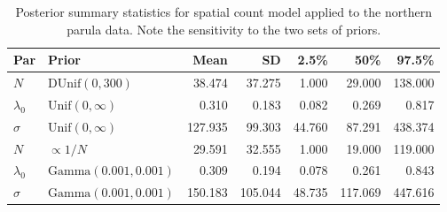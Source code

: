 \begin{table}%
  \centering
  \caption{Posterior summary statistics for spatial count
    model applied to the northern parula data. Note the sensitivity to
    the two sets of priors. }
  \begin{tabular}{llrrrrr}
    \hline
    Par          & Prior                       & Mean    & SD      & 2.5\%  & 50\%    & 97.5\%         \\
    \hline
    $N$          & $\text{DUnif}(0,300)$       & 38.474  & 37.275  & 1.000  & 29.000  & 138.000        \\
    $\lambda_0$  & $\text{Unif}(0,\infty)$     & 0.310   & 0.183   & 0.082  & 0.269   & 0.817          \\
    $\sigma$     & $\text{Unif}(0,\infty)$    & 127.935 & 99.303  & 44.760 & 87.291  & 438.374        \\
    \hline
    $N$          & $\propto 1/N$               & 29.591  & 32.555  & 1.000  & 19.000  & 119.000        \\
    $\lambda_0$  & $\text{Gamma}(0.001,0.001)$ & 0.309   & 0.194   & 0.078  & 0.261   & 0.843          \\
    $\sigma$     & $\text{Gamma}(0.001,0.001)$ & 150.183 & 105.044 & 48.735 & 117.069 & 447.616        \\
    \hline
  \end{tabular}
  \label{unmarked.tab.nopa}
\end{table}

